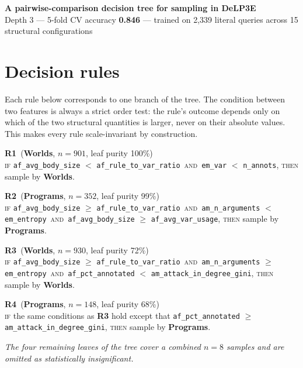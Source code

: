 \documentclass[11pt,a4paper]{article}
\newcommand{\worlds}{\textcolor{worldsblue}{\textbf{Worlds}}}
\newcommand{\programs}{\textcolor{programsorange}{\textbf{Programs}}}
\begin{document}
\begin{center}
{\Large\textbf{A pairwise-comparison decision tree for sampling in DeLP3E}}\\[4pt]
{\small Depth 3 --- 5-fold CV accuracy \textbf{0.846} --- trained on 2{,}339 literal queries across 15 structural configurations}
\end{center}

\vspace{4pt}

\section*{Decision rules}

Each rule below corresponds to one branch of the tree. The condition between two features is always a strict order test: the rule's outcome depends only on which of the two structural quantities is larger, never on their absolute values. This makes every rule scale-invariant by construction.

\vspace{4pt}

\textbf{R1} \,(\worlds, $n{=}901$, leaf purity 100\%)\\
\textsc{if} \texttt{af\_avg\_body\_size} $<$ \texttt{af\_rule\_to\_var\_ratio}
\,\textsc{and}\, \texttt{em\_var} $<$ \texttt{n\_annots},
\textsc{then} sample by \worlds.

\textbf{R2} \,(\programs, $n{=}352$, leaf purity 99\%)\\
\textsc{if} \texttt{af\_avg\_body\_size} $\geq$ \texttt{af\_rule\_to\_var\_ratio}
\,\textsc{and}\, \texttt{am\_n\_arguments} $<$ \texttt{em\_entropy}
\,\textsc{and}\, \texttt{af\_avg\_body\_size} $\geq$ \texttt{af\_avg\_var\_usage},
\textsc{then} sample by \programs.

\textbf{R3} \,(\worlds, $n{=}930$, leaf purity 72\%)\\
\textsc{if} \texttt{af\_avg\_body\_size} $\geq$ \texttt{af\_rule\_to\_var\_ratio}
\,\textsc{and}\, \texttt{am\_n\_arguments} $\geq$ \texttt{em\_entropy}
\,\textsc{and}\, \texttt{af\_pct\_annotated} $<$ \texttt{am\_attack\_in\_degree\_gini},
\textsc{then} sample by \worlds.

\textbf{R4} \,(\programs, $n{=}148$, leaf purity 68\%)\\
\textsc{if} the same conditions as \textbf{R3} hold except that \texttt{af\_pct\_annotated} $\geq$ \texttt{am\_attack\_in\_degree\_gini},
\textsc{then} sample by \programs.

\vspace{2pt}
\noindent\footnotesize\textit{The four remaining leaves of the tree cover a combined $n{=}8$ samples and are omitted as statistically insignificant.}
\normalsize
\end{document}
